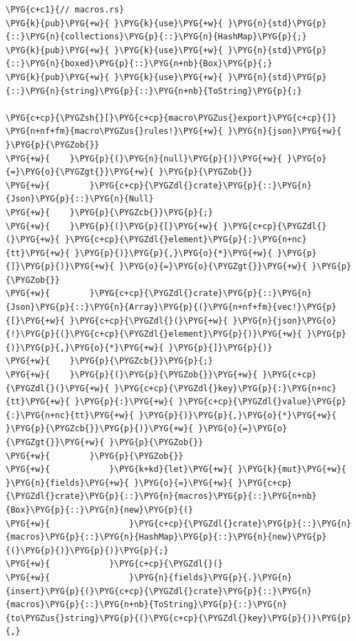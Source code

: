 \begin{Verbatim}[commandchars=\\\{\},breaklines=true,breakanywhere=true,fontsize=\codefont,xleftmargin=17bp]
\PYG{c+c1}{// macros.rs}
\PYG{k}{pub}\PYG{+w}{ }\PYG{k}{use}\PYG{+w}{ }\PYG{n}{std}\PYG{p}{::}\PYG{n}{collections}\PYG{p}{::}\PYG{n}{HashMap}\PYG{p}{;}
\PYG{k}{pub}\PYG{+w}{ }\PYG{k}{use}\PYG{+w}{ }\PYG{n}{std}\PYG{p}{::}\PYG{n}{boxed}\PYG{p}{::}\PYG{n+nb}{Box}\PYG{p}{;}
\PYG{k}{pub}\PYG{+w}{ }\PYG{k}{use}\PYG{+w}{ }\PYG{n}{std}\PYG{p}{::}\PYG{n}{string}\PYG{p}{::}\PYG{n+nb}{ToString}\PYG{p}{;}

\PYG{c+cp}{\PYGZsh{}[}\PYG{c+cp}{macro\PYGZus{}export}\PYG{c+cp}{]}
\PYG{n+nf+fm}{macro\PYGZus{}rules!}\PYG{+w}{ }\PYG{n}{json}\PYG{+w}{ }\PYG{p}{\PYGZob{}}
\PYG{+w}{    }\PYG{p}{(}\PYG{n}{null}\PYG{p}{)}\PYG{+w}{ }\PYG{o}{=}\PYG{o}{\PYGZgt{}}\PYG{+w}{ }\PYG{p}{\PYGZob{}}
\PYG{+w}{        }\PYG{c+cp}{\PYGZdl{}crate}\PYG{p}{::}\PYG{n}{Json}\PYG{p}{::}\PYG{n}{Null}
\PYG{+w}{    }\PYG{p}{\PYGZcb{}}\PYG{p}{;}
\PYG{+w}{    }\PYG{p}{(}\PYG{p}{[}\PYG{+w}{ }\PYG{c+cp}{\PYGZdl{}(}\PYG{+w}{ }\PYG{c+cp}{\PYGZdl{}element}\PYG{p}{:}\PYG{n+nc}{tt}\PYG{+w}{ }\PYG{p}{)}\PYG{p}{,}\PYG{o}{*}\PYG{+w}{ }\PYG{p}{]}\PYG{p}{)}\PYG{+w}{ }\PYG{o}{=}\PYG{o}{\PYGZgt{}}\PYG{+w}{ }\PYG{p}{\PYGZob{}}
\PYG{+w}{        }\PYG{c+cp}{\PYGZdl{}crate}\PYG{p}{::}\PYG{n}{Json}\PYG{p}{::}\PYG{n}{Array}\PYG{p}{(}\PYG{n+nf+fm}{vec!}\PYG{p}{[}\PYG{+w}{ }\PYG{c+cp}{\PYGZdl{}(}\PYG{+w}{ }\PYG{n}{json}\PYG{o}{!}\PYG{p}{(}\PYG{c+cp}{\PYGZdl{}element}\PYG{p}{)}\PYG{+w}{ }\PYG{p}{)}\PYG{p}{,}\PYG{o}{*}\PYG{+w}{ }\PYG{p}{]}\PYG{p}{)}
\PYG{+w}{    }\PYG{p}{\PYGZcb{}}\PYG{p}{;}
\PYG{+w}{    }\PYG{p}{(}\PYG{p}{\PYGZob{}}\PYG{+w}{ }\PYG{c+cp}{\PYGZdl{}(}\PYG{+w}{ }\PYG{c+cp}{\PYGZdl{}key}\PYG{p}{:}\PYG{n+nc}{tt}\PYG{+w}{ }\PYG{p}{:}\PYG{+w}{ }\PYG{c+cp}{\PYGZdl{}value}\PYG{p}{:}\PYG{n+nc}{tt}\PYG{+w}{ }\PYG{p}{)}\PYG{p}{,}\PYG{o}{*}\PYG{+w}{ }\PYG{p}{\PYGZcb{}}\PYG{p}{)}\PYG{+w}{ }\PYG{o}{=}\PYG{o}{\PYGZgt{}}\PYG{+w}{ }\PYG{p}{\PYGZob{}}
\PYG{+w}{        }\PYG{p}{\PYGZob{}}
\PYG{+w}{            }\PYG{k+kd}{let}\PYG{+w}{ }\PYG{k}{mut}\PYG{+w}{ }\PYG{n}{fields}\PYG{+w}{ }\PYG{o}{=}\PYG{+w}{ }\PYG{c+cp}{\PYGZdl{}crate}\PYG{p}{::}\PYG{n}{macros}\PYG{p}{::}\PYG{n+nb}{Box}\PYG{p}{::}\PYG{n}{new}\PYG{p}{(}
\PYG{+w}{                }\PYG{c+cp}{\PYGZdl{}crate}\PYG{p}{::}\PYG{n}{macros}\PYG{p}{::}\PYG{n}{HashMap}\PYG{p}{::}\PYG{n}{new}\PYG{p}{(}\PYG{p}{)}\PYG{p}{)}\PYG{p}{;}
\PYG{+w}{            }\PYG{c+cp}{\PYGZdl{}(}
\PYG{+w}{                }\PYG{n}{fields}\PYG{p}{.}\PYG{n}{insert}\PYG{p}{(}\PYG{c+cp}{\PYGZdl{}crate}\PYG{p}{::}\PYG{n}{macros}\PYG{p}{::}\PYG{n+nb}{ToString}\PYG{p}{::}\PYG{n}{to\PYGZus{}string}\PYG{p}{(}\PYG{c+cp}{\PYGZdl{}key}\PYG{p}{)}\PYG{p}{,}

\end{Verbatim}
